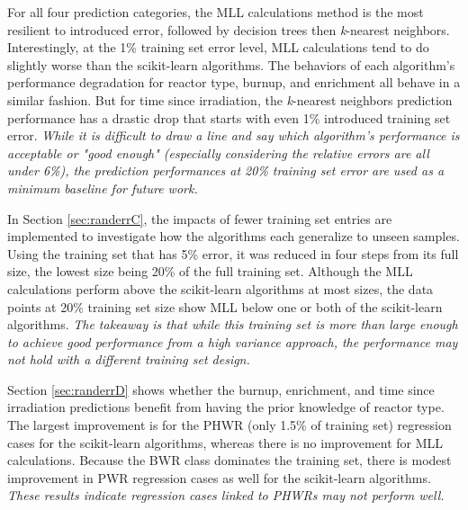 For all four prediction categories, the \gls{MLL} calculations method is the
most resilient to introduced error, followed by decision trees then
\textit{k}-nearest neighbors. Interestingly, at the 1\% training set error
level, \gls{MLL} calculations tend to do slightly worse than the scikit-learn
algorithms.   The behaviors of each algorithm's performance degradation
for reactor type, burnup, and enrichment all behave in a similar fashion. But
for time since irradiation, the \textit{k}-nearest neighbors prediction
performance has a drastic drop that starts with even 1\% introduced training
set error.  \textit{While it is difficult to draw a line and say which
algorithm's performance is acceptable or "good enough" (especially considering
the relative errors are all under 6\%), the prediction performances at 20\%
training set error are used as a minimum baseline for future work.}

In Section \ref{sec:randerrC}, the impacts of fewer training set entries are
implemented to investigate how the algorithms each generalize to unseen
samples. Using the training set that has 5\% error, it was reduced in four
steps from its full size, the lowest size being 20\% of the full training set.
Although the \gls{MLL} calculations perform above the scikit-learn algorithms
at most sizes, the data points at 20\% training set size show \gls{MLL} below
one or both of the scikit-learn algorithms. \textit{The takeaway is that while
this training set is more than large enough to achieve good performance from a
high variance approach, the performance may not hold with a different training
set design.}

Section \ref{sec:randerrD} shows whether the burnup, enrichment, and time since
irradiation predictions benefit from having the prior knowledge of reactor
type.  The largest improvement is for the \gls{PHWR} (only 1.5\% of training
set) regression cases for the scikit-learn algorithms, whereas there is no
improvement for \gls{MLL} calculations. Because the \gls{BWR} class dominates
the training set, there is modest improvement in \gls{PWR} regression cases as
well for the scikit-learn algorithms. \textit{These results indicate regression
cases linked to \gls{PHWR}s may not perform well.} 

